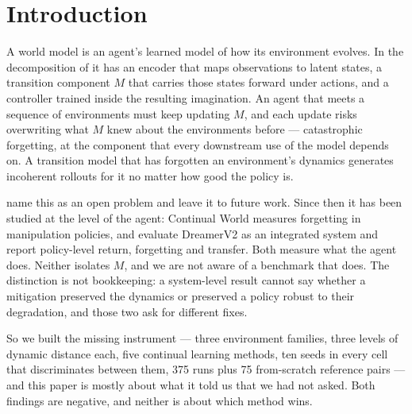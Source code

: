 %

\section{Introduction}
\label{sec:intro}

A world model is an agent's learned model of how its environment evolves. In
the decomposition of \citet{ha2018worldmodels} it has an encoder that maps
observations to latent states, a transition component $M$ that carries those
states forward under actions, and a controller trained inside the resulting
imagination. An agent that meets a sequence of environments must keep updating
$M$, and each update risks overwriting what $M$ knew about the environments
before --- catastrophic forgetting, at the component that every downstream use
of the model depends on. A transition model that has forgotten an environment's
dynamics generates incoherent rollouts for it no matter how good the policy is.

\citet{ha2018worldmodels} name this as an open problem and leave it to future
work. Since then it has been studied at the level of the agent: Continual World
\citep{wolczyk2021continualworld} measures forgetting in manipulation policies,
and \citet{kessler2023effectiveness} evaluate DreamerV2 as an integrated system
and report policy-level return, forgetting and transfer. Both measure what the
agent does. Neither isolates $M$, and we are not aware of a benchmark that
does. The distinction is not bookkeeping: a system-level result cannot say
whether a mitigation preserved the dynamics or preserved a policy robust to
their degradation, and those two ask for different fixes.

So we built the missing instrument --- three environment families, three levels
of dynamic distance each, five continual learning methods, ten seeds in every
cell that discriminates between them, 375 runs plus 75 from-scratch reference
pairs --- and this paper is mostly about what it told us that we had not asked. Both findings are negative, and neither is about
which method wins.

